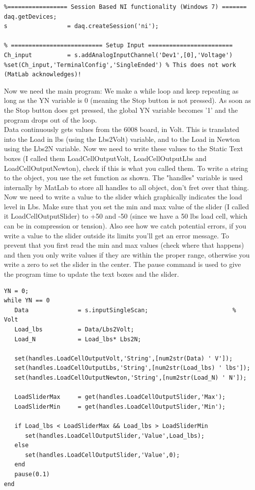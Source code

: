 \documentclass[12pt,letterpaper]{article}
\begin{document}
\begin{lstlisting}
%================= Session Based NI functionality (Windows 7) =======
daq.getDevices;
s                 = daq.createSession('ni');

% ========================== Setup Input ========================
Ch_input          = s.addAnalogInputChannel('Dev1',[0],'Voltage')
%set(Ch_input,'TerminalConfig','SingleEnded') % This does not work (MatLab acknowledges)!
\end{lstlisting}

Now we need the main program: We make a while loop and keep repeating as long as the YN variable is 0 (meaning the Stop button is not pressed). As soon as the Stop button does get pressed, the global YN variable becomes '1' and the program drops out of the loop.\\

Data continuously gets values from the 6008 board, in Volt. This is translated into the Load in lbs (using the Lbs2Volt) variable, and to the Load in Newton using the Lbs2N variable. Now we need to write these values to the Static Text boxes (I called them LoadCellOutputVolt, LoadCellOutputLbs and LoadCellOutputNewton), check if this is what you called them. To write a string to the object, you use the set function as shown. The "handles" variable is used internally by MatLab to store all handles to all object, don't fret over that thing.\\

Now we need to write a value to the slider which graphically indicates the load level in Lbs. Make sure that you set the min and max value of the slider (I called it LoadCellOutputSlider) to +50 and -50 (since we have a 50 lbs load cell, which can be in compression or tension). Also see how we catch potential errors, if you write a value to the slider outside its limits you'll get an error message. To prevent that you first read the min and max values (check where that happens) and then you only write values if they are within the proper range, otherwise you write a zero to set the slider in the center. The pause command is used to give the program time to update the text boxes and the slider.

\begin{lstlisting}
YN = 0;
while YN == 0
   Data              = s.inputSingleScan;                        % Volt
   Load_lbs          = Data/Lbs2Volt;
   Load_N            = Load_lbs* Lbs2N;
   
   set(handles.LoadCellOutputVolt,'String',[num2str(Data) ' V']);
   set(handles.LoadCellOutputLbs,'String',[num2str(Load_lbs) ' lbs']);
   set(handles.LoadCellOutputNewton,'String',[num2str(Load_N) ' N']);
   
   LoadSliderMax     = get(handles.LoadCellOutputSlider,'Max');
   LoadSliderMin     = get(handles.LoadCellOutputSlider,'Min');
   
   if Load_lbs < LoadSliderMax && Load_lbs > LoadSliderMin
      set(handles.LoadCellOutputSlider,'Value',Load_lbs);
   else
      set(handles.LoadCellOutputSlider,'Value',0);
   end
   pause(0.1)
end
\end{lstlisting}
\end{document}
